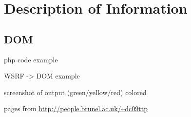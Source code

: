 \section{Description of Information}

\subsection{DOM}
php code example

WSRF -> DOM example

\newpage

screenshot of output (green/yellow/red) colored

\newpage

pages from \url{http://people.brunel.ac.uk/~dc09ttp}

\newpage